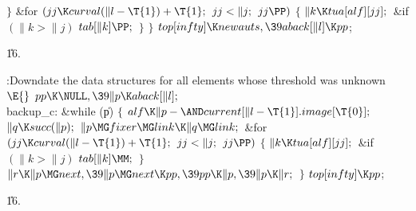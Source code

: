 \4${}\}{}$\2\6
\&{for} ${}(\\{jj}\K\\{curval}(\|l-\T{1})+\T{1};{}$ ${}\\{jj}<\|j;{}$ ${}\\{jj}%
\PP){}$\5
${}\{{}$\1\6
${}\|k\K\\{tua}[\\{alf}][\\{jj}];{}$\6
\&{if} ${}(\|k>\|j){}$\1\5
${}\\{tab}[\|k]\PP;{}$\2\6
\4${}\}{}$\2\6
\4${}\}{}$\2\6
${}\\{top}[\\{infty}]\K\\{newauts},\39\\{aback}[\|l]\K\\{pp}{}$;\par
\U16.\fi

\B{}:Downdate the data structures for all elements whose threshold was
unknown\X${}\E{}$\6
$\\{pp}\K\NULL,\39\|p\K\\{aback}[\|l];{}$\6
\4\\{backup\_c}:\5
\&{while} (\|p)\5
${}\{{}$\1\6
${}\\{alf}\K\|p-{\AND}\\{current}[\|l-\T{1}].\\{image}[\T{0}];{}$\6
${}\|q\K\\{succ}(\|p);{}$\6
${}\|p\MG\\{fixer}\MG\\{link}\K\|q\MG\\{link};{}$\6
\&{for} ${}(\\{jj}\K\\{curval}(\|l-\T{1})+\T{1};{}$ ${}\\{jj}<\|j;{}$ ${}\\{jj}%
\PP){}$\5
${}\{{}$\1\6
${}\|k\K\\{tua}[\\{alf}][\\{jj}];{}$\6
\&{if} ${}(\|k>\|j){}$\1\5
${}\\{tab}[\|k]\MM;{}$\2\6
\4${}\}{}$\2\6
${}\|r\K\|p\MG\\{next},\39\|p\MG\\{next}\K\\{pp},\39\\{pp}\K\|p,\39\|p\K\|r;{}$%
\6
\4${}\}{}$\2\6
${}\\{top}[\\{infty}]\K\\{pp}{}$;\par
\U16.\fi

